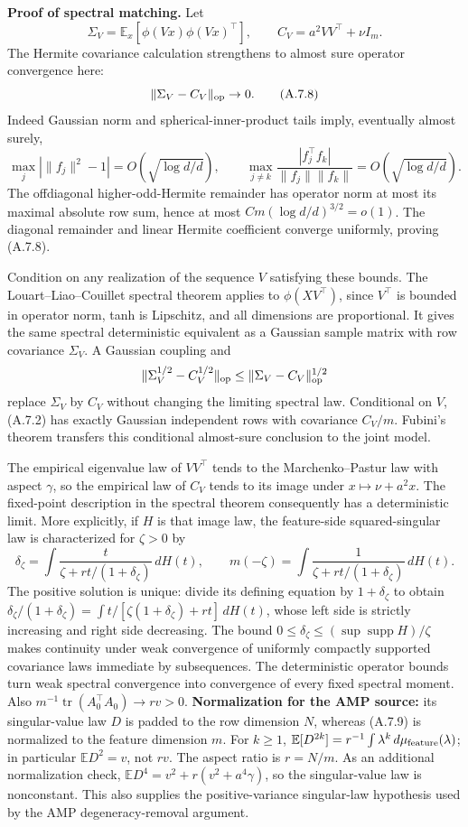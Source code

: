 \documentclass[
  11pt,
  a4paper,
]{article}
\begin{document}
\textbf{Proof of spectral matching.} Let \[
\Sigma_V=\mathbb E_x[\phi(Vx)\phi(Vx)^\top],\qquad
C_V=a^2VV^\top+\nu I_m.
\] The Hermite covariance calculation strengthens to almost sure
operator convergence here: \[
\|\Sigma_V-C_V\|_{\rm op}\to0. \tag{A.7.8}
\] Indeed Gaussian norm and spherical-inner-product tails imply,
eventually almost surely, \[
\max_j|\|f_j\|^2-1|=O(\sqrt{\log d/d}),\qquad
\max_{j\ne k}\frac{|f_j^\top f_k|}{\|f_j\|\|f_k\|}
=O(\sqrt{\log d/d}).
\] The offdiagonal higher-odd-Hermite remainder has operator norm at
most its maximal absolute row sum, hence at most
\(C m(\log d/d)^{3/2}=o(1)\). The diagonal remainder and linear Hermite
coefficient converge uniformly, proving (A.7.8).

Condition on any realization of the sequence \(V\) satisfying these
bounds. The Louart--Liao--Couillet spectral theorem applies to
\(\phi(XV^\top)\), since \(V^\top\) is bounded in operator norm, tanh is
Lipschitz, and all dimensions are proportional. It gives the same
spectral deterministic equivalent as a Gaussian sample matrix with row
covariance \(\Sigma_V\). A Gaussian coupling and \[
\|\Sigma_V^{1/2}-C_V^{1/2}\|_{\rm op}
\le\|\Sigma_V-C_V\|_{\rm op}^{1/2}
\] replace \(\Sigma_V\) by \(C_V\) without changing the limiting
spectral law. Conditional on \(V\), (A.7.2) has exactly Gaussian
independent rows with covariance \(C_V/m\). Fubini's theorem transfers
this conditional almost-sure conclusion to the joint model.

The empirical eigenvalue law of \(VV^\top\) tends to the
Marchenko--Pastur law with aspect \(\gamma\), so the empirical law of
\(C_V\) tends to its image under \(x\mapsto\nu+a^2x\). The fixed-point
description in the spectral theorem consequently has a deterministic
limit. More explicitly, if \(H\) is that image law, the feature-side
squared-singular law is characterized for \(\zeta>0\) by \[
\delta_\zeta=\int\frac{t}{\zeta+rt/(1+\delta_\zeta)}\,dH(t),\qquad
m(-\zeta)=\int\frac1{\zeta+rt/(1+\delta_\zeta)}\,dH(t).
\tag{A.7.9}
\] The positive solution is unique: divide its defining equation by
\(1+\delta_\zeta\) to obtain
\(\delta_\zeta/(1+\delta_\zeta)=\int t/[\zeta(1+\delta_\zeta)+rt]\,dH(t)\),
whose left side is strictly increasing and right side decreasing. The
bound \(0\le\delta_\zeta\le(\sup\operatorname{supp}H)/\zeta\) makes
continuity under weak convergence of uniformly compactly supported
covariance laws immediate by subsequences. The deterministic operator
bounds turn weak spectral convergence into convergence of every fixed
spectral moment. Also
\(m^{-1}\operatorname{tr}(A_0^\top A_0)\to r v>0\).
\textbf{Normalization for the AMP source:} its singular-value law \(D\)
is padded to the row dimension \(N\), whereas (A.7.9) is normalized to
the feature dimension \(m\). For \(k\ge1\),
\(\mathbb E[D^{2k}]=r^{-1}\int\lambda^k\,d\mu_{\rm feature}(\lambda)\);
in particular \(\mathbb E D^2=v\), not \(rv\). The aspect ratio is
\(r=N/m\). As an additional normalization check,
\(\mathbb E D^4=v^2+r(v^2+a^4\gamma)\), so the singular-value law is
nonconstant. This also supplies the positive-variance singular-law
hypothesis used by the AMP degeneracy-removal argument.
\end{document}
